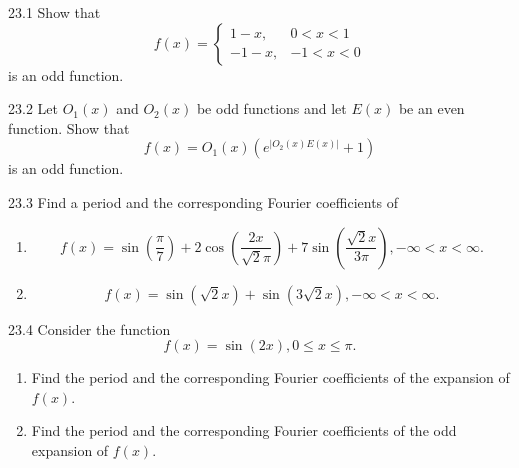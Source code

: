 
\begin{problem}{23.1}
  Show that
  \begin{equation*}
    f(x) = \begin{cases}
      1-x,  & 0 < x < 1\\
    -1-x, & -1 < x < 0
    \end{cases}
  \end{equation*}
  is an odd function.
\end{problem}

\begin{problem}{23.2}
  Let $O_1(x)$ and $O_2(x)$ be odd functions and let $E(x)$ be an even function.
  Show that
  \begin{equation*}
    f(x) = O_1(x) \left( e^{\left| O_2 (x) E(x) \right|} + 1 \right)
  \end{equation*}
  is an odd function.
\end{problem}

\begin{problem}{23.3}
  Find a period and the corresponding Fourier coefficients of
  \begin{enumerate}[label=\alph*)]
    \item
      \begin{equation*}
        f(x) = \sin \left( \frac{\pi}{7} \right) + 2 \cos \left( \frac{2x}{\sqrt{2}\pi} \right) + 7 \sin \left( \frac{\sqrt{2}x}{3\pi} \right), - \infty < x < \infty
      .\end{equation*}
    \item
      \begin{equation*}
        f(x) = \sin \left( \sqrt{2}x \right) + \sin \left( 3 \sqrt{2}x \right), -\infty < x < \infty
      .\end{equation*}
  \end{enumerate}
\end{problem}

\begin{problem}{23.4}
  Consider the function
  \begin{equation*}
    f(x) = \sin(2x), 0 \leq x \leq \pi
  .\end{equation*}
  
  \begin{enumerate}[label=\alph*)]
    \item Find the period and the corresponding Fourier coefficients of the expansion of $f(x)$.
    \item Find the period and the corresponding Fourier coefficients of the odd expansion of $f(x)$.
  \end{enumerate}
\end{problem}

